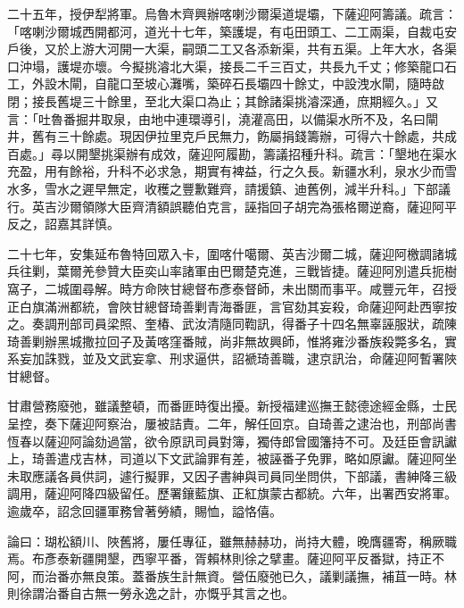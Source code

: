 \begin{pinyinscope}
二十五年，授伊犁將軍。烏魯木齊興辦喀喇沙爾渠道堤壩，下薩迎阿籌議。疏言：「喀喇沙爾城西開都河，道光十七年，築護堤，有屯田頭工、二工兩渠，自裁屯安戶後，又於上游大河開一大渠，嗣頭二工又各添新渠，共有五渠。上年大水，各渠口沖塌，護堤亦壞。今擬挑濬北大渠，接長二千三百丈，共長九千丈；修築龍口石工，外設木閘，自龍口至坡心灘嘴，築碎石長壩四十餘丈，中設洩水閘，隨時啟閉；接長舊堤三十餘里，至北大渠口為止；其餘諸渠挑濬深通，庶期經久。」又言：「吐魯番掘井取泉，由地中連環導引，澆灌高田，以備渠水所不及，名曰閘井，舊有三十餘處。現因伊拉里克戶民無力，飭屬捐錢籌辦，可得六十餘處，共成百處。」尋以開墾挑渠辦有成效，薩迎阿履勘，籌議招種升科。疏言：「墾地在渠水充盈，用有餘裕，升科不必求急，期實有裨益，行之久長。新疆水利，泉水少而雪水多，雪水之遲早無定，收穫之豐歉難齊，請援鎮、迪舊例，減半升科。」下部議行。英吉沙爾領隊大臣齊清額誤聽伯克言，誣指回子胡完為張格爾逆裔，薩迎阿平反之，詔嘉其詳慎。

二十七年，安集延布魯特回眾入卡，圍喀什噶爾、英吉沙爾二城，薩迎阿檄調諸城兵往剿，葉爾羌參贊大臣奕山率諸軍由巴爾楚克進，三戰皆捷。薩迎阿別遣兵扼樹窩子，二城圍尋解。時方命陜甘總督布彥泰督師，未出關而事平。咸豐元年，召授正白旗滿洲都統，會陜甘總督琦善剿青海番匪，言官劾其妄殺，命薩迎阿赴西寧按之。奏調刑部司員梁照、奎椿、武汝清隨同鞫訊，得番子十四名無辜誣服狀，疏陳琦善剿辦黑城撒拉回子及黃喀窪番賊，尚非無故興師，惟將雍沙番族殺斃多名，實系妄加誅戮，並及文武妄拿、刑求逼供，詔褫琦善職，逮京訊治，命薩迎阿暫署陜甘總督。

甘肅營務廢弛，雖議整頓，而番匪時復出擾。新授福建巡撫王懿德途經金縣，士民呈控，奏下薩迎阿察治，屢被詰責。二年，解任回京。自琦善之逮治也，刑部尚書恆春以薩迎阿論劾過當，欲令原訊司員對簿，獨侍郎曾國籓持不可。及廷臣會訊讞上，琦善遣戍吉林，司道以下文武論罪有差，被誣番子免罪，略如原讞。薩迎阿坐未取應議各員供詞，遽行擬罪，又因子書紳與司員同坐問供，下部議，書紳降三級調用，薩迎阿降四級留任。歷署鑲藍旗、正紅旗蒙古都統。六年，出署西安將軍。逾歲卒，詔念回疆軍務曾著勞績，賜恤，謚恪僖。

論曰：瑚松額川、陜舊將，屢任專征，雖無赫赫功，尚持大體，晚膺疆寄，稱厥職焉。布彥泰新疆開墾，西寧平番，胥賴林則徐之擘畫。薩迎阿平反番獄，持正不阿，而治番亦無良策。蓋番族生計無資。營伍廢弛已久，議剿議撫，補苴一時。林則徐謂治番自古無一勞永逸之計，亦慨乎其言之也。


\end{pinyinscope}